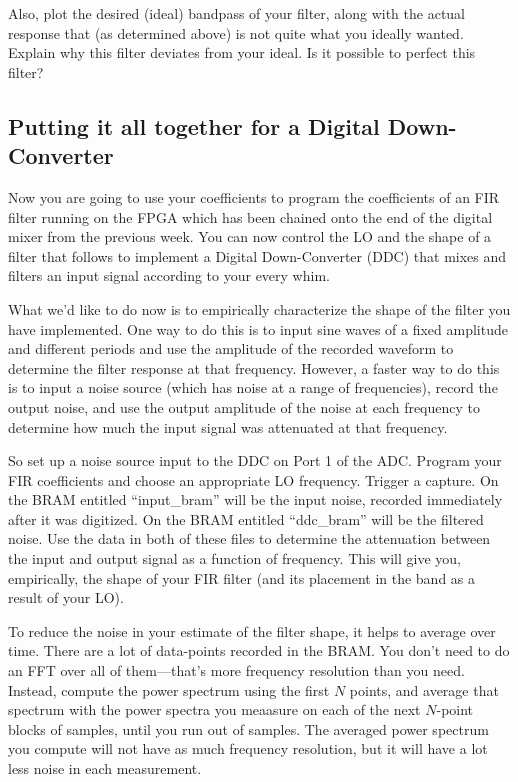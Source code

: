 \documentclass[11pt]{article}
\begin{document}
Also, plot the desired (ideal) bandpass of your filter, along with the actual
response that (as determined above) is not quite what you ideally wanted.
Explain why this filter deviates from your ideal.  Is it possible to perfect
this filter?

\subsection{Putting it all together for a Digital Down-Converter} \label{ddc}

Now you are going to use your coefficients to program the coefficients of an FIR filter running on the
FPGA which has been chained onto the end of the digital mixer from the previous week.  You can now control
the LO and the shape of a filter that follows to implement a Digital Down-Converter (DDC) that mixes and filters
an input signal according to your every whim.

What we'd like to do now is to empirically characterize the shape of the filter you have implemented.  One way to
do this is to input sine waves of a fixed amplitude and different periods and use the amplitude of the recorded
waveform to determine the filter response at that frequency.  However, a faster way to do this is to input a noise
source (which has noise at a range of frequencies), record the output noise, and use the output amplitude of the noise
at each frequency to determine how much the input signal was attenuated at that frequency.

So set up a noise source input to the DDC on Port 1 of the ADC.  Program your FIR coefficients and choose an appropriate
LO frequency.  Trigger a capture.  On the BRAM entitled ``input\_bram'' will be the input noise, recorded immediately after
it was digitized.  On the BRAM entitled ``ddc\_bram'' will be the filtered noise.  Use the data in
both of these files to determine the attenuation between the input and output signal as a function of frequency.  This will
give you, empirically, the shape of your FIR filter (and its placement in the band as a result of your LO).

To reduce the noise in your estimate of the filter shape, it helps to average over time.  There are a lot of data-points recorded
in the BRAM.  You don't need to do an FFT over all of them---that's more frequency resolution than you need.  Instead, compute
the power spectrum using the first $N$ points, and average that spectrum with the power spectra you meaasure on each of the next
$N$-point blocks of samples, until you run out of samples.  The averaged power spectrum you compute will not have as much
frequency resolution, but it will have a lot less noise in each measurement.
\end{document}
